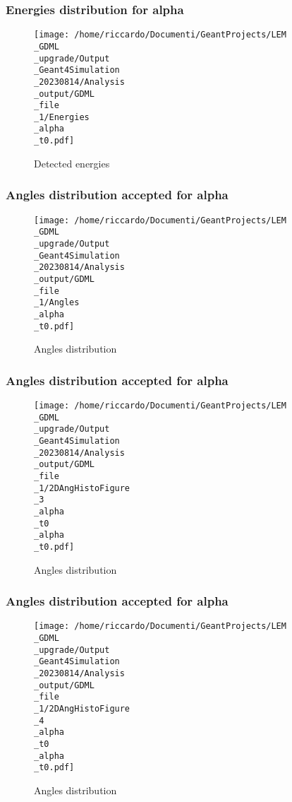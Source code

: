 \documentclass[8pt]{beamer}
\begin{document}
            \begin{frame}
                \frametitle{Energies distribution for alpha}
            
        \begin{figure}[h]
            \centering
            \texttt{[image: /home/riccardo/Documenti/GeantProjects/LEM\\\_GDML\\\_upgrade/Output\\\_Geant4Simulation\\\_20230814/Analysis\\\_output/GDML\\\_file\\\_1/Energies\\\_alpha\\\_t0.pdf]}
            \caption{Detected energies}
        \end{figure}
        
            \end{frame}
            
            \begin{frame}
                \frametitle{Angles distribution accepted for alpha}
            
        \begin{figure}[h]
            \centering
            \texttt{[image: /home/riccardo/Documenti/GeantProjects/LEM\\\_GDML\\\_upgrade/Output\\\_Geant4Simulation\\\_20230814/Analysis\\\_output/GDML\\\_file\\\_1/Angles\\\_alpha\\\_t0.pdf]}
            \caption{Angles distribution}
        \end{figure}
        
            \end{frame}
            
            \begin{frame}
                \frametitle{Angles distribution accepted for alpha}
            
        \begin{figure}[h]
            \centering
            \texttt{[image: /home/riccardo/Documenti/GeantProjects/LEM\\\_GDML\\\_upgrade/Output\\\_Geant4Simulation\\\_20230814/Analysis\\\_output/GDML\\\_file\\\_1/2DAngHistoFigure\\\_3\\\_alpha\\\_t0\\\_alpha\\\_t0.pdf]}
            \caption{Angles distribution}
        \end{figure}
        
            \end{frame}
            
            \begin{frame}
                \frametitle{Angles distribution accepted for alpha}
            
        \begin{figure}[h]
            \centering
            \texttt{[image: /home/riccardo/Documenti/GeantProjects/LEM\\\_GDML\\\_upgrade/Output\\\_Geant4Simulation\\\_20230814/Analysis\\\_output/GDML\\\_file\\\_1/2DAngHistoFigure\\\_4\\\_alpha\\\_t0\\\_alpha\\\_t0.pdf]}
            \caption{Angles distribution}
        \end{figure}
        
            \end{frame}
            
\end{document}
